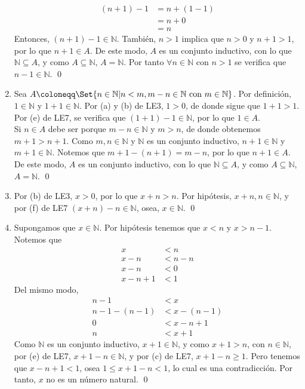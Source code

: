 \documentclass[11pt]{article}
\newcommand{\N}{\mathbb{N}}
\let\set\Set
\begin{document}
\begin{enumerate}[label=\alph*)]
\begin{align*}
        (n+1)-1 &= n+(1-1) \\
        &= n+ 0\\
        &= n
    \end{align*}
    Entonces, $(n+1)-1\in \N$. También, $n>1$ implica que $n>0$ y $n+1>1$, por lo que $n+1\in A$. De este modo, $A$ es un conjunto inductivo, con lo que $\N \subseteq A$, y como $A\subseteq \N$, $A=\N$. Por tanto $\forall n\in \N$ con $n>1$ se verifica que $n-1\in \N$. \qed
    \item Sea $A \coloneqq \set{n\in \N| n<m, m-n\in\N \ \text{con} \ m\in\N}$. Por definición, $1\in \N$ y $1+1\in \N$. Por (a) y (b) de LE3, $1>0$, de donde sigue que $1+1>1$. Por (e) de LE7, se verifica que $(1+1)-1\in \N$, por lo que $1\in A$. \\[5pt] Si $n \in A$ debe ser porque $m-n\in \N$ y $m>n$, de donde obtenemos $m+1>n+1$. Como $m,n\in \N$ y $\N$ es un conjunto inductivo, $n+1\in \N$ y $m+1 \in \N$. Notemos que $m+1-(n+1)=m-n$, por lo que $n+1\in A$. De este modo, $A$ es un conjunto inductivo, con lo que $\N \subseteq A$, y como $A\subseteq \N$, $A=\N$. \qed 
%
    \item Por (b) de LE3, $x>0$, por lo que $x+n>n$. Por hipótesis, $x+n, n\in \N$, y por (f) de LE7 $(x+n)-n \in \N$, osea, $x\in \N$. \qed
    \item Supongamos que $x\in \N$. Por hipótesis tenemos que $x<n$ y $x>n-1$. Notemos que \begin{align*}
        x &< n\\
        x -n &< n-n\\
        x-n &< 0\\
        x-n +1 &< 1
    \end{align*}
    Del mismo modo, \begin{align*}
        n-1 &< x\\
        n-1-(n-1) &< x - (n-1)\\
        0 &< x-n+1\\
        n &< x+1
    \end{align*}
    Como $\N$ es un conjunto inductivo, $x+1\in \N$, y como $x+1>n$, con $n\in \N$, por (e) de LE7, $x+1-n \in \N$, y por (c) de LE7, $x+1-n\geq 1$. Pero tenemos que $x-n+1<1$, osea $1\leq x+1-n<1$, lo cual es una contradicción. Por tanto, $x$ no es un número natural. \qed
\end{enumerate}
\end{document}
